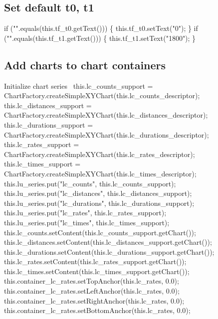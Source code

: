 \subsection{Set default t0, t1}
\nwenddocs{}\endmoddef{}
if ("".equals(this.tf_t0.getText())) \{
  this.tf_t0.setText("0");
\}
if ("".equals(this.tf_t1.getText())) \{
  this.tf_t1.setText("1800");
\}
\nwendcode{}\nwdocspar

\subsection{Add charts to chart containers}
\nwenddocs{}\endmoddef{}
\LA{}Initialize chart series~{\nwtagstyle{}}\RA{}
this.lc_counts_support = ChartFactory.createSimpleXYChart(this.lc_counts_descriptor);
this.lc_distances_support = ChartFactory.createSimpleXYChart(this.lc_distances_descriptor);
this.lc_durations_support = ChartFactory.createSimpleXYChart(this.lc_durations_descriptor);
this.lc_rates_support = ChartFactory.createSimpleXYChart(this.lc_rates_descriptor);
this.lc_times_support = ChartFactory.createSimpleXYChart(this.lc_times_descriptor);
this.lu_series.put("lc_counts", this.lc_counts_support);
this.lu_series.put("lc_distances", this.lc_distances_support);
this.lu_series.put("lc_durations", this.lc_durations_support);
this.lu_series.put("lc_rates", this.lc_rates_support);
this.lu_series.put("lc_times", this.lc_times_support);
this.lc_counts.setContent(this.lc_counts_support.getChart());
this.lc_distances.setContent(this.lc_distances_support.getChart());
this.lc_durations.setContent(this.lc_durations_support.getChart());
this.lc_rates.setContent(this.lc_rates_support.getChart());
this.lc_times.setContent(this.lc_times_support.getChart());
this.container_lc_rates.setTopAnchor(this.lc_rates, 0.0);
this.container_lc_rates.setLeftAnchor(this.lc_rates, 0.0);
this.container_lc_rates.setRightAnchor(this.lc_rates, 0.0);
this.container_lc_rates.setBottomAnchor(this.lc_rates, 0.0);
